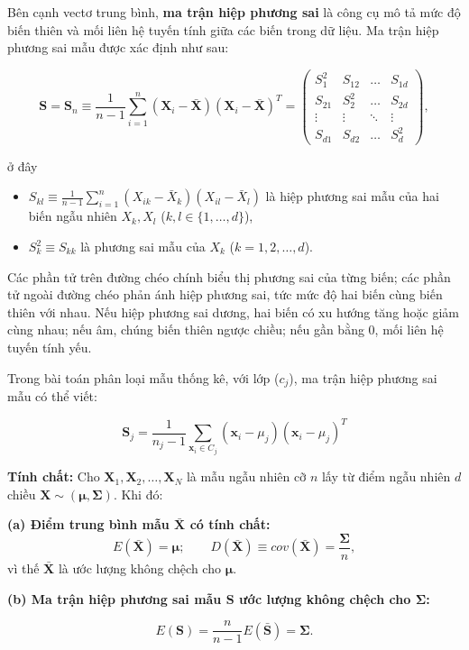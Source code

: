 Bên cạnh vectơ trung bình, \textbf{ma trận hiệp phương sai} là công cụ mô tả mức độ biến thiên và mối liên hệ tuyến tính giữa các biến trong dữ liệu. Ma trận hiệp phương sai mẫu được xác định như sau:

\[
\bm{S} = \bm{S}_n \equiv \frac{1}{n-1} \sum_{i=1}^{n} (\bm{X}_i - \bar{\bm{X}})(\bm{X}_i - \bar{\bm{X}})^T = 
\begin{pmatrix}
S_1^2 & S_{12} & \dots & S_{1d} \\
S_{21} & S_2^2 & \dots & S_{2d} \\
\vdots & \vdots & \ddots & \vdots \\
S_{d1} & S_{d2} & \dots & S_d^2
\end{pmatrix},
\]

\noindent ở đây
\begin{itemize}
    \item $S_{kl} \equiv \frac{1}{n-1} \sum_{i=1}^{n} (X_{ik} - \bar{X}_k)(X_{il} - \bar{X}_l)$ là hiệp phương sai mẫu của hai biến ngẫu nhiên $X_k, X_l$ ($k, l \in \{1, \dots, d\}$),
    \item $S_k^2 \equiv S_{kk}$ là phương sai mẫu của $X_k$ ($k = 1, 2, \dots, d$).
\end{itemize}

Các phần tử trên đường chéo chính biểu thị phương sai của từng biến; các phần tử ngoài đường chéo phản ánh hiệp phương sai, tức mức độ hai biến cùng biến thiên với nhau. Nếu hiệp phương sai dương, hai biến có xu hướng tăng hoặc giảm cùng nhau; nếu âm, chúng biến thiên ngược chiều; nếu gần bằng 0, mối liên hệ tuyến tính yếu.

Trong bài toán phân loại mẫu thống kê, với lớp ($c_j$), ma trận hiệp phương sai mẫu có thể viết:

\[
\bm{S}_j = \frac{1}{n_j - 1} \sum_{\bm{x}_i \in C_j} (\bm{x}_i - \mu_j)(\bm{x}_i - \mu_j)^T
\]

\noindent \textbf{Tính chất:} Cho $\bm{X}_1, \bm{X}_2, \dots, \bm{X}_N$ là mẫu ngẫu nhiên cỡ $n$ lấy từ điểm ngẫu nhiên $d$ chiều $\bm{X} \sim (\bm{\mu}, \bm{\Sigma})$. Khi đó:

\medskip
\noindent \textbf{(a) Điểm trung bình mẫu $\bar{\bm{X}}$ có tính chất:}
\[
E(\bar{\bm{X}}) = \bm{\mu}; \qquad D(\bar{\bm{X}}) \equiv cov(\bar{\bm{X}}) = \frac{\bm{\Sigma}}{n},
\]
vì thế $\bar{\bm{X}}$ là ước lượng không chệch cho $\bm{\mu}$.

\medskip
\noindent \textbf{(b) Ma trận hiệp phương sai mẫu $\bm{S}$ ước lượng không chệch cho $\bm{\Sigma}$:}

\[
E(\bm{S}) = \frac{n}{n-1} E(\bar{\bm{S}}) = \bm{\Sigma}.
\]
